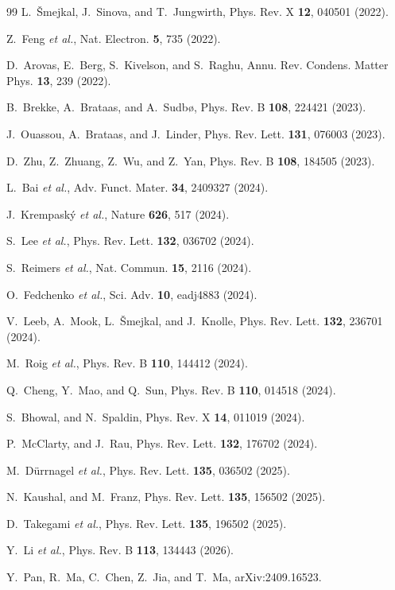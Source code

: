 \documentclass[aps,prb,reprint,superscriptaddress,amsmath,amssymb,floatfix]{revtex4-2}
\begin{document}
\begin{thebibliography}{99}
L.~Šmejkal, J.~Sinova, and T.~Jungwirth,
Phys. Rev. X \textbf{12}, 040501 (2022).

Z.~Feng \textit{et al.},
Nat. Electron. \textbf{5}, 735 (2022).

D.~Arovas, E.~Berg, S.~Kivelson, and S.~Raghu,
Annu. Rev. Condens. Matter Phys. \textbf{13}, 239 (2022).

B.~Brekke, A.~Brataas, and A.~Sudbø,
Phys. Rev. B \textbf{108}, 224421 (2023).

J.~Ouassou, A.~Brataas, and J.~Linder,
Phys. Rev. Lett. \textbf{131}, 076003 (2023).

D.~Zhu, Z.~Zhuang, Z.~Wu, and Z.~Yan,
Phys. Rev. B \textbf{108}, 184505 (2023).

L.~Bai \textit{et al.},
Adv. Funct. Mater. \textbf{34}, 2409327 (2024).

J.~Krempaský \textit{et al.},
Nature \textbf{626}, 517 (2024).

S.~Lee \textit{et al.},
Phys. Rev. Lett. \textbf{132}, 036702 (2024).

S.~Reimers \textit{et al.},
Nat. Commun. \textbf{15}, 2116 (2024).

O.~Fedchenko \textit{et al.},
Sci. Adv. \textbf{10}, eadj4883 (2024).

V.~Leeb, A.~Mook, L.~Šmejkal, and J.~Knolle,
Phys. Rev. Lett. \textbf{132}, 236701 (2024).

M.~Roig \textit{et al.},
Phys. Rev. B \textbf{110}, 144412 (2024).

Q.~Cheng, Y.~Mao, and Q.~Sun,
Phys. Rev. B \textbf{110}, 014518 (2024).

S.~Bhowal, and N.~Spaldin,
Phys. Rev. X \textbf{14}, 011019 (2024).

P.~McClarty, and J.~Rau,
Phys. Rev. Lett. \textbf{132}, 176702 (2024).

M.~Dürrnagel \textit{et al.},
Phys. Rev. Lett. \textbf{135}, 036502 (2025).

N.~Kaushal, and M.~Franz,
Phys. Rev. Lett. \textbf{135}, 156502 (2025).

D.~Takegami \textit{et al.},
Phys. Rev. Lett. \textbf{135}, 196502 (2025).

Y.~Li \textit{et al.},
Phys. Rev. B \textbf{113}, 134443 (2026).

Y.~Pan, R.~Ma, C.~Chen, Z.~Jia, and T.~Ma,
arXiv:2409.16523.

\end{thebibliography}
\end{document}
